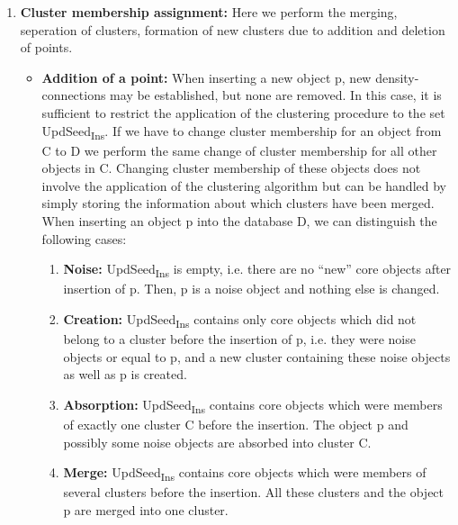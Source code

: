 \documentclass[acmsmall]{acmart}
\begin{document}
\begin{enumerate}
\begin{itemize}
        
    \end{itemize}

    \item \textbf{Cluster membership assignment: } Here we perform the merging, seperation of clusters, formation of new clusters due to addition and deletion of points. \newline 
    
    \begin{itemize}
        \item \textbf{Addition of a point: }
        When inserting a new object p, new density-connections may be established, but none are removed. In this case, it is sufficient to restrict the application of the clustering procedure
        to the set {UpdSeed\textsubscript{Ins}}. If we have to change cluster membership for an object from C to D we perform the same change of cluster membership for all other objects in C. Changing cluster membership of these objects does not involve the application of the clustering algorithm but can be handled by simply storing the information about which clusters have been merged.
        When inserting an object p into the database D, we can
        distinguish the following cases:
        \\ 

        \begin{enumerate}
            \item \textbf{Noise: }
            {UpdSeed\textsubscript{Ins}} is empty, i.e. there are no “new” core objects after insertion of p. Then, p is a noise object and nothing else is changed.
            \item \textbf{Creation: } {UpdSeed\textsubscript{Ins}} contains only core objects which did not belong to a cluster before the insertion of p, i.e. they were noise objects or equal to p, and a new cluster containing these noise objects as well as p is created.
            \item \textbf{Absorption: } {UpdSeed\textsubscript{Ins}} contains core objects which were members of exactly one cluster C before the insertion. The object p and possibly some noise objects are absorbed into cluster C.
            \item \textbf{Merge: } {UpdSeed\textsubscript{Ins}} contains core objects which were members of several clusters before the insertion. All these clusters and the object p are merged into one cluster. \\
        \end{enumerate}
        

\end{itemize}
\end{enumerate}
\end{document}
